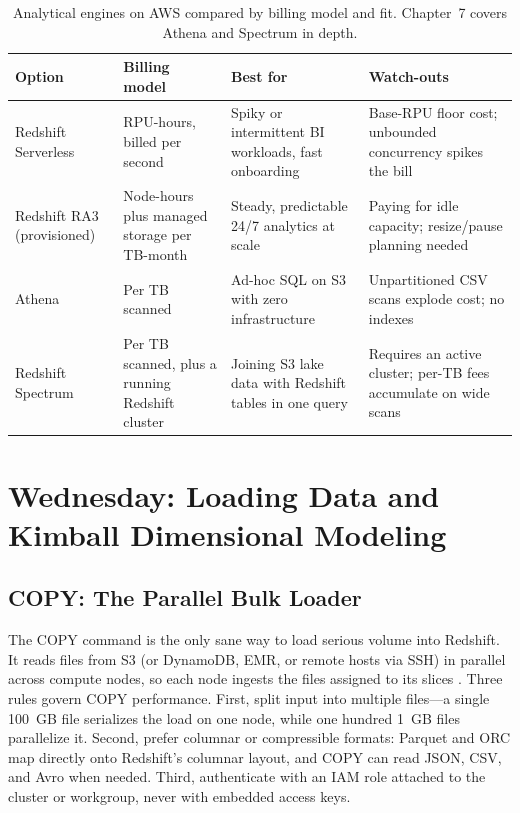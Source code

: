 \begin{table}[H]
\centering
\small
\begin{tabular}{@{}p{2.9cm}p{3.2cm}p{3.6cm}p{4.4cm}@{}}
\toprule
\textbf{Option} & \textbf{Billing model} & \textbf{Best for} & \textbf{Watch-outs} \\
\midrule
Redshift Serverless & RPU-hours, billed per second & Spiky or intermittent BI workloads, fast onboarding & Base-RPU floor cost; unbounded concurrency spikes the bill \\
Redshift RA3 (provisioned) & Node-hours plus managed storage per TB-month & Steady, predictable 24/7 analytics at scale & Paying for idle capacity; resize/pause planning needed \\
Athena & Per TB scanned & Ad-hoc SQL on S3 with zero infrastructure & Unpartitioned CSV scans explode cost; no indexes \\
Redshift Spectrum & Per TB scanned, plus a running Redshift cluster & Joining S3 lake data with Redshift tables in one query & Requires an active cluster; per-TB fees accumulate on wide scans \\
\bottomrule
\end{tabular}
\caption{Analytical engines on AWS compared by billing model and fit. Chapter~7 covers Athena and Spectrum in depth.}
\label{tab:analytics-pricing}
\end{table}

\section{Wednesday: Loading Data and Kimball Dimensional Modeling}
\subsection{COPY: The Parallel Bulk Loader}
The COPY command is the only sane way to load serious volume into Redshift. It reads files from S3 (or DynamoDB, EMR, or remote hosts via SSH) in parallel across compute nodes, so each node ingests the files assigned to its slices \cite{awsRedshiftCOPY}. Three rules govern COPY performance. First, split input into multiple files---a single 100~GB file serializes the load on one node, while one hundred 1~GB files parallelize it. Second, prefer columnar or compressible formats: Parquet and ORC map directly onto Redshift's columnar layout, and COPY can read JSON, CSV, and Avro when needed. Third, authenticate with an IAM role attached to the cluster or workgroup, never with embedded access keys.

